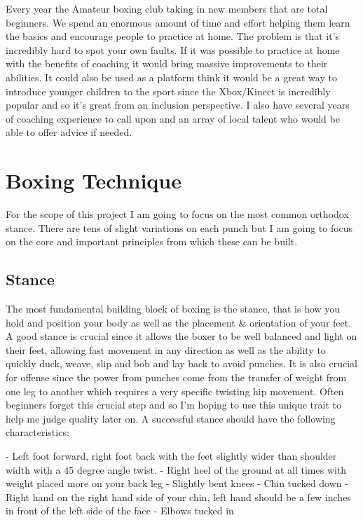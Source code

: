 Every year the Amateur boxing club taking in new members that are total beginners. We spend an enormous amount of time and effort helping them learn the basics and encourage people to practice at home. The problem is that it’s incredibly hard to spot your own faults. If it was possible to practice at home with the benefits of coaching it would bring massive improvements to their abilities. It could also be used as a platform think it would be a great way to introduce younger children to the sport since the Xbox/Kinect is incredibly popular and so it’s great from an inclusion perspective.
I also have several years of coaching experience to call upon and an array of local talent who would be able to offer advice if needed.

\section{Boxing Technique}
\label{sec:sec02}
For the scope of this project I am going to focus on the most common orthodox stance. There are tens of slight variations on each punch but I am going to focus on the core and important principles from which these can be built.

\subsection{Stance}
\label{subsec:subsec02}
The most fundamental building block of boxing is the stance, that is how you hold and position your body as well as the placement \& orientation of your feet. A good stance is crucial since it allows the boxer to be well balanced and light on their feet, allowing fast movement in any direction as well as the ability to quickly duck, weave, slip and bob and lay back to avoid punches. It is also crucial for offense since the power from punches come from the transfer of weight from one leg to another which requires a very specific twisting hip movement. Often beginners forget this crucial step and so I'm hoping to use this unique trait to help me judge quality later on. A successful stance should have the following characteristics:

- Left foot forward, right foot back with the feet slightly wider than shoulder width with a 45 degree angle twist.
- Right heel of the ground at all times with weight placed more on your back leg
- Slightly bent knees
- Chin tucked down
- Right hand on the right hand side of your chin, left hand should be a few inches in front of the left side of the face
- Elbows tucked in

